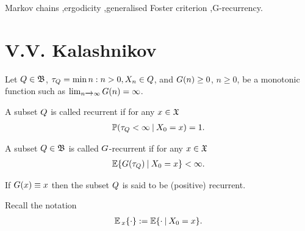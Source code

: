 \begin{frontmatter}
		\begin{keyword}
			
			Markov chains \sep ergodicity \sep generalised Foster criterion \sep G-recurrency.
			
		\end{keyword}
		
	\end{frontmatter}
	
	
	
	\section{V.V. Kalashnikov}
	Let $Q \in \mathfrak{B}$, $\tau_{Q} = \min{n : n > 0, X_{n} \in Q}$, and $G(n) \geq 0$, $n \geq 0$, be a monotonic function such as $\lim_{n \xrightarrow{} \infty}G(n) = \infty$.
	\begin{definition}
		A subset $Q$ is called recurrent if for any $x \in \mathfrak{X}$
		\begin{gather*}
		\operatorname*{\mathbb{P}}(\tau_{Q} < \infty \: | \: X_{0} = x) = 1.
		\end{gather*}
	\end{definition}
	\begin{definition}
		A subset $Q \in \mathfrak{B}$ is called $G$-recurrent if for any $x \in \mathfrak{X}$
		\begin{gather}
		\operatorname*{\mathbb{E}}\{G(\tau_{Q}) \: | \: X_{0} = x\} < \infty.
		\end{gather}
	\end{definition}
	If $G(x) \equiv x$ then the subset $Q$ is said to be (positive) recurrent.
	
	Recall the notation
	\begin{gather}
	\operatorname*{\mathbb{E}}{}_{x}\{\cdot\} := \operatorname*{\mathbb{E}}\{\cdot \: | \: X_{0} = x\}.
	\end{gather}
	
